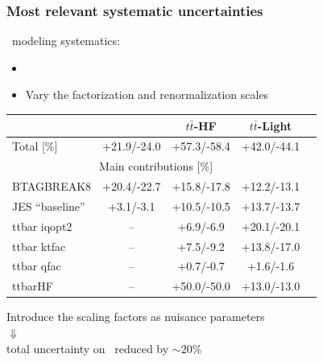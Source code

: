 \begin{frame}\frametitle{Most relevant systematic uncertainties}
\centering\footnotesize

\ttbar\ modeling systematics:
\begin{itemize}
\item \tthf\ 
\item Vary the factorization and renormalization scales
\end{itemize}

\myskip

{
\scriptsize
\begin{tabular}{l*{4}{c}}\toprule
 & \TTbar & $t\bar{t}$-HF & $t\bar{t}$-Light \\
\midrule
Total [\%]& +21.9/-24.0 & +57.3/-58.4 & +42.0/-44.1 \\
\midrule
\multicolumn{4}{c}{Main contributions [\%]}\\
BTAGBREAK8 & +20.4/-22.7 & +15.8/-17.8 & +12.2/-13.1 \\
JES ``baseline'' & +3.1/-3.1 & +10.5/-10.5 & +13.7/-13.7 \\
ttbar iqopt2 & -- & +6.9/-6.9 & +20.1/-20.1 \\
ttbar ktfac & -- & +7.5/-9.2 & +13.8/-17.0 \\
ttbar qfac & -- & +0.7/-0.7 & +1.6/-1.6 \\
ttbarHF & -- &+50.0/-50.0 & +13.0/-13.0 \\
\bottomrule
\end{tabular}
}

\myskip

Introduce the scaling factors as {\cccolor nuisance parameters}\\
{\Large $\Downarrow$}\\
total uncertainty on \tthf\ reduced by $\sim 20$\% 

\end{frame}


